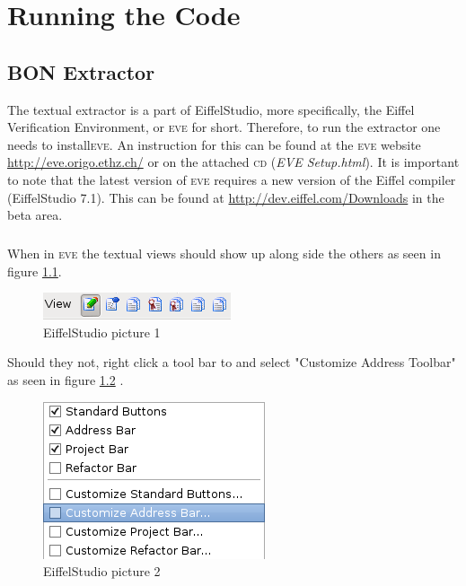 \appendix
\chapter{Running the Code}
\section{BON Extractor}
The textual \bon{} extractor is a part of EiffelStudio, more specifically, the Eiffel Verification Environment, or \textsc{eve} for short. Therefore, to run the extractor one needs to install\textsc{eve}. An instruction for this can be found at the \textsc{eve} website \url{http://eve.origo.ethz.ch/} or on the attached \textsc{cd} (\textit{EVE Setup.html}). It is important to note that the latest version of \textsc{eve} requires a new version of the Eiffel compiler (EiffelStudio 7.1). This can be found at \url{http://dev.eiffel.com/Downloads} in the beta area.

\paragraph{}
When in \textsc{eve} the textual \bon{} views should show up along side the others as seen in figure \ref{fig:EiffelStudio1}.

\begin{figure}[H]
\centering
\includegraphics[scale=0.8]{images/es1.png}
\caption{EiffelStudio picture 1}
\label{fig:EiffelStudio1}
\end{figure}

Should they not, right click a tool bar to and select "Customize Address Toolbar" as seen in figure \ref{fig:EiffelStudio2} .

\begin{figure}[H]
\centering
\includegraphics[scale=0.8]{images/es2.png}
\caption{EiffelStudio picture 2}
\label{fig:EiffelStudio2}
\end{figure}

